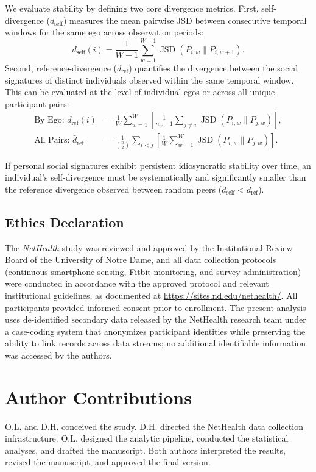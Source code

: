 \documentclass[11pt,letterpaper]{article}
\newcommand{\JSD}{\operatorname{JSD}}
\newcommand{\dself}{d_{\mathrm{self}}}
\newcommand{\dref}{d_{\mathrm{ref}}}
\begin{document}
We evaluate stability by defining two core divergence metrics. First, self-divergence ($\dself$) measures the mean pairwise JSD between consecutive temporal windows for the same ego across observation periods:
\begin{equation}
\dself(i) = \frac{1}{W-1} \sum_{w=1}^{W-1} \JSD(P_{i,w} \parallel P_{i,w+1}).
\end{equation}
Second, reference-divergence ($\dref$) quantifies the divergence between the social signatures of distinct individuals observed within the same temporal window. This can be evaluated at the level of individual egos or across all unique participant pairs:
\begin{align}
\text{By Ego: } \dref(i) &= \frac{1}{W} \sum_{w=1}^W \left[ \frac{1}{n_w - 1} \sum_{j \neq i} \JSD(P_{i,w} \parallel P_{j,w}) \right], \\
\text{All Pairs: } \bar{d}_{\mathrm{ref}} &= \frac{1}{\binom{n}{2}} \sum_{i < j} \left[ \frac{1}{W} \sum_{w=1}^W \JSD(P_{i,w} \parallel P_{j,w}) \right].
\end{align}

If personal social signatures exhibit persistent idiosyncratic stability over time, an individual's self-divergence must be systematically and significantly smaller than the reference divergence observed between random peers ($\dself < \dref$).

\subsection{Ethics Declaration}
The \textit{NetHealth} study was reviewed and approved by the Institutional Review Board of the University of Notre Dame, and all data collection protocols (continuous smartphone sensing, Fitbit monitoring, and survey administration) were conducted in accordance with the approved protocol and relevant institutional guidelines, as documented at \url{https://sites.nd.edu/nethealth/}. All participants provided informed consent prior to enrollment. The present analysis uses de-identified secondary data released by the NetHealth research team under a case-coding system that anonymizes participant identities while preserving the ability to link records across data streams; no additional identifiable information was accessed by the authors.





\section*{Author Contributions}
O.L. and D.H. conceived the study. D.H. directed the NetHealth data collection infrastructure. O.L. designed the analytic pipeline, conducted the statistical analyses, and drafted the manuscript. Both authors interpreted the results, revised the manuscript, and approved the final version.
\end{document}
